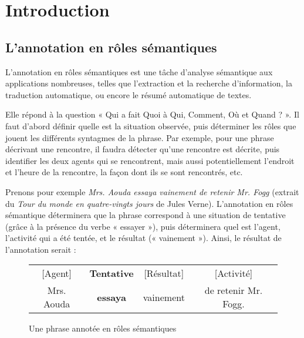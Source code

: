 \chapter{Introduction}
\label{ch:intro}

\section{L'annotation en rôles sémantiques}

L'annotation en rôles sémantiques est une tâche d'analyse sémantique aux
applications nombreuses, telles que l'extraction et la recherche d'information,
la traduction automatique, ou encore le résumé automatique de textes.


Elle répond à la question « Qui a fait Quoi à Qui, Comment, Où et Quand ? ».
Il faut d'abord définir quelle est la situation observée, puis déterminer les
rôles que jouent les différents syntagmes de la phrase. Par exemple, pour une
phrase décrivant une rencontre, il faudra détecter qu'une rencontre est
décrite, puis identifier les deux agents qui se rencontrent, mais aussi
potentiellement l'endroit et l'heure de la rencontre, la façon dont ils se sont
rencontrés, etc.

Prenons pour exemple \emph{Mrs. Aouda essaya vainement de retenir Mr. Fogg}
(extrait du \emph{Tour du monde en quatre-vingts jours} de Jules Verne).
L'annotation en rôles sémantique déterminera que la phrase correspond à une
situation de tentative (grâce à la présence du verbe « essayer »), puis
déterminera quel est l'agent, l'activité qui a été tentée, et le résultat («
vainement »). Ainsi, le résultat de l'annotation serait :

\begin{figure}[htbl]
    \centering
    \begin{tabular}{cccc}
      [Agent]  & \textbf{Tentative} & [Résultat]  & [Activité]           \tabularnewline
    Mrs. Aouda & \textbf{essaya}  & vainement  & de retenir Mr. Fogg. \tabularnewline
    \end{tabular}
    \caption{Une phrase annotée en rôles sémantiques}
\end{figure}

